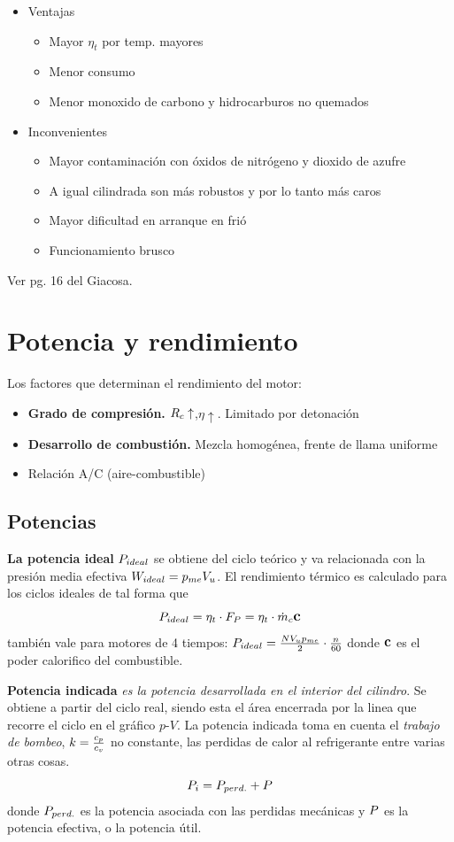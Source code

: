 \begin{itemize}
    \item Ventajas
    \begin{itemize}
        \item Mayor $\eta_t$ por temp. mayores
        \item Menor consumo
        \item Menor monoxido de carbono y hidrocarburos no quemados
    \end{itemize}
    \item Inconvenientes
    \begin{itemize}
        \item Mayor contaminación con óxidos de nitrógeno y dioxido de azufre
        \item A igual cilindrada son más robustos y por lo tanto más caros
        \item Mayor dificultad en arranque en frió
        \item Funcionamiento brusco
    \end{itemize}
\end{itemize}
Ver pg. 16 del Giacosa.

\section{Potencia y rendimiento}
Los factores que determinan el rendimiento del motor:
\begin{itemize}
    \item \textbf{Grado de compresión.} $R_c \uparrow$,$\eta \uparrow$. Limitado por detonación
    \item \textbf{Desarrollo de combustión.} Mezcla homogénea, frente de llama uniforme
    \item Relación A/C (aire-combustible)
\end{itemize}

\subsection{Potencias}
\textbf{La potencia ideal} $P_{ideal}$ se obtiene del ciclo teórico y va relacionada con la presión media efectiva $W_{ideal} = p_{me} V_u$. El rendimiento térmico es calculado para los ciclos ideales de tal forma que  
\[
P_{ideal}=\eta_t\cdot F_P=\eta_t \cdot \dot{m}_c \mbox{\large$\mathbf{c}$}
\]
también vale para motores de 4 tiempos: $P_{ideal}=\frac{N V_u p_{me}}{2}\cdot \frac{n}{60}$
donde $\mbox{\large$\mathbf{c}$}$ es el poder calorifico del combustible.

\textbf{Potencia indicada} \textit{es la potencia desarrollada en el interior del cilindro}. Se obtiene a partir del ciclo real, siendo esta el área encerrada por la linea que recorre el ciclo en el gráfico $p$-$V$. La potencia indicada toma en cuenta el \textit{trabajo de bombeo}, $k=\frac{c_p}{c_v}$ no constante, las perdidas de calor al refrigerante entre varias otras cosas.
\[
P_i=P_{perd.}+P
\]
donde $P_{perd.}$ es la potencia asociada con las perdidas mecánicas y $P$ es la potencia efectiva, o la potencia útil.


